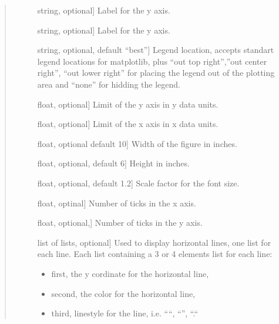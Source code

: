 \documentclass[letterpaper,10pt,english]{sphinxmanual}
\begin{document}
\begin{fulllineitems}
\begin{quote}
\begin{description}
\begin{description}
\item[{}] \leavevmode{[}string, optional{]}
Label for the y axis.

\item[{}] \leavevmode{[}string, optional{]}
Label for the y axis.

\item[{}] \leavevmode{[}string, optional, default “best”{]}
Legend location, accepts standart legend locations 
for matplotlib, plus “out top right”,”out center right”, 
“out lower right” for placing the legend out of 
the plotting area and “none” for hidding the legend.

\item[{}] \leavevmode{[}float, optional{]}
Limit of the y axis in y data units.

\item[{}] \leavevmode{[}float, optional{]}
Limit of the x axis in x data units.

\item[{}] \leavevmode{[}float, optional default 10{]}
Width of the figure in inches.

\item[{}] \leavevmode{[}float, optional, default 6{]}
Height in inches.

\item[{}] \leavevmode{[}float, optional, default 1.2{]}
Scale factor for the font size.

\item[{}] \leavevmode{[}float, optinal{]}
Number of ticks in the x axis.

\item[{}] \leavevmode{[}float, optional,{]}
Number of ticks in the y axis.

\item[{}] \leavevmode{[}list of lists, optional{]}
Used to display horizontal lines, one list for each line.
Each list containing a 3 or 4 elements list for each line:
\begin{itemize}
\item {} 
first, the y cordinate for the horizontal line,

\item {} 
second, the color for the horizontal line,

\item {} 
third, linestyle for the line, i.e. “\sphinxhyphen{}“, “\textendash{}”, “\sphinxhyphen{}.\sphinxhyphen{}“


\end{itemize}
\end{description}
\end{description}
\end{quote}
\end{fulllineitems}
\end{document}
